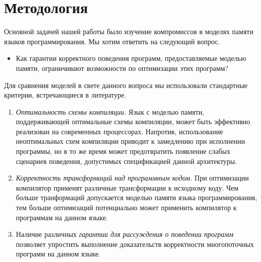\section{Методология}
\label{sec:methodology}

Основной задачей нашей работы было изучение
компромиссов в  моделях памяти 
языков программирования. Мы хотим ответить на следующий вопрос. 

\begin{itemize}
  \item Как гарантии корректного поведения программ, 
    предоставляемые моделью памяти, ограничивают возможности 
    по оптимизации этих программ?
\end{itemize}

Для сравнения моделей в свете данного вопроса мы использовали стандартные критерии,
встречающиеся в литературе. 

\begin{enumerate}[label=\textbf{C.\arabic*}]
  
  \item \label{item:criteria:opt-comp}
    \emph{Оптимальность схемы компиляции.}
    Язык с моделью памяти, поддерживающей оптимальные 
    схемы компиляции, может быть эффективно реализован
    на современных процессорах. 
    Напротив, использование неоптимальных схем компиляции
    приводит к замедлению при исполнении программы, 
    но в то же время может предотвратить появление 
    слабых сценариев поведения, допустимых спецификацией данной архитектуры. 

  \item \label{item:criteria:sound-trans}
    \emph{Корректность трансформаций над программным кодом.} 
    При оптимизации компилятор
    применят различные трансформации к исходному коду. 
    Чем больше транформаций допускается моделью памяти языка программирования, 
    тем больше оптимизаций потенциально может применить компилятор 
    к программам на данном языке. 

  \item \label{item:criteria:reasoning}
    Наличие  различных \emph{гарантии для рассуждения о поведении программ}
    позволяет упростить  выполнение доказательств  корректности 
    многопоточных программ  на данном языке. 
  
\end{enumerate}

